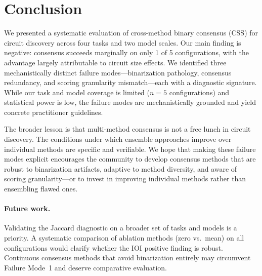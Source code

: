\documentclass[11pt,a4paper]{article}
\newcommand{\css}{\textsc{CSS}}
\begin{document}
\section{Conclusion}

We presented a systematic evaluation of cross-method binary consensus (\css{}) for circuit discovery across four tasks and two model scales. Our main finding is negative: consensus succeeds marginally on only 1 of 5 configurations, with the advantage largely attributable to circuit size effects. We identified three mechanistically distinct failure modes---binarization pathology, consensus redundancy, and scoring granularity mismatch---each with a diagnostic signature. While our task and model coverage is limited ($n=5$ configurations) and statistical power is low, the failure modes are mechanistically grounded and yield concrete practitioner guidelines.

The broader lesson is that multi-method consensus is not a free lunch in circuit discovery. The conditions under which ensemble approaches improve over individual methods are specific and verifiable. We hope that making these failure modes explicit encourages the community to develop consensus methods that are robust to binarization artifacts, adaptive to method diversity, and aware of scoring granularity---or to invest in improving individual methods rather than ensembling flawed ones.

\paragraph{Future work.}
Validating the Jaccard diagnostic on a broader set of tasks and models is a priority. A systematic comparison of ablation methods (zero vs.\ mean) on all configurations would clarify whether the IOI positive finding is robust. Continuous consensus methods \cite{mondorf2025cross} that avoid binarization entirely may circumvent Failure Mode~1 and deserve comparative evaluation.
\end{document}
